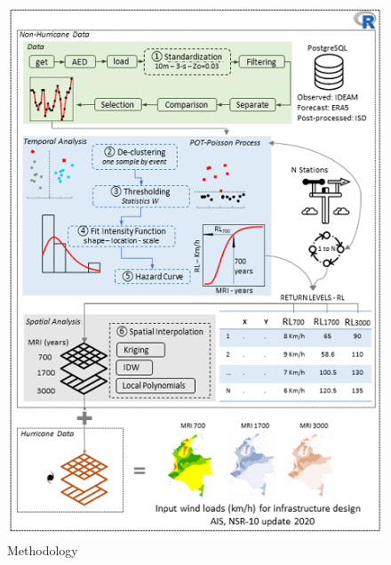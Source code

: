 \documentclass[12pt,oneside]{reedthesis}
\begin{document}
\footnotesize
\begin{figure}
\includegraphics[width=6.47in]{figure/methodology} \caption{Methodology}\label{fig:methodology}
\end{figure}
\normalsize
\end{document}
